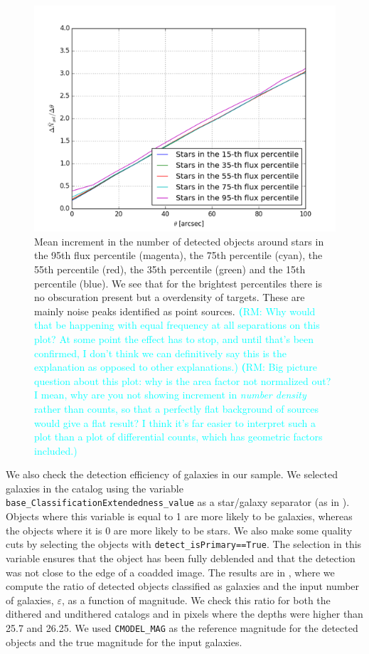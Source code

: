 \documentclass[twocolumn]{aastex62}
\newcommand{\rachel}[1]{{\textcolor{cyan}{{\textbf (RM: #1)}}}}
\begin{document}
\begin{figure}
\centering
\includegraphics[width=0.9\columnwidth]{dngal_dtheta.png}
\caption{Mean increment in the number of detected objects around stars in the 95th flux percentile (magenta), the 75th percentile (cyan), the 55th percentile (red), the 35th percentile (green) and the 15th percentile (blue). We see that for the brightest percentiles there is no obscuration present but a overdensity of targets. These are mainly noise peaks identified as point sources. \rachel{Why would that be happening with equal frequency at all separations on this plot?  At some point the effect has to stop, and until that's been confirmed, I don't think we can definitively say this is the explanation as opposed to other explanations.} \rachel{Big picture question about this plot: why is the area factor not normalized out?  I mean, why are you not showing increment in {\em number density} rather than counts, so that a perfectly flat background of sources would give a flat result?  I think it's far easier to interpret such a plot than a plot of differential counts, which has geometric factors included.}}
\label{fig:galdens_derivative}
\end{figure}

We also check the detection efficiency of galaxies in our sample. We selected galaxies in the catalog using the variable \texttt{base\_ClassificationExtendedness\_value} as a star/galaxy separator (as in \citealt{2017arXiv170506766B}). Objects where this variable is equal to 1 are more likely to be galaxies, whereas the objects where it is 0 are more likely to be stars. We also make some quality cuts by selecting the objects with \texttt{detect\_isPrimary==True}. The selection in this variable ensures that the object has been fully deblended and that the detection was not close to the edge of a coadded image. The results are in , where we compute the ratio of detected objects classified as galaxies and the input number of galaxies, $\varepsilon$, as a function of magnitude. We check this ratio for both the dithered and undithered catalogs and in pixels where the depths were higher than 25.7 and 26.25. We used \texttt{CMODEL\_MAG} as the reference magnitude for the detected objects and the true magnitude for the input galaxies. 
\end{document}

